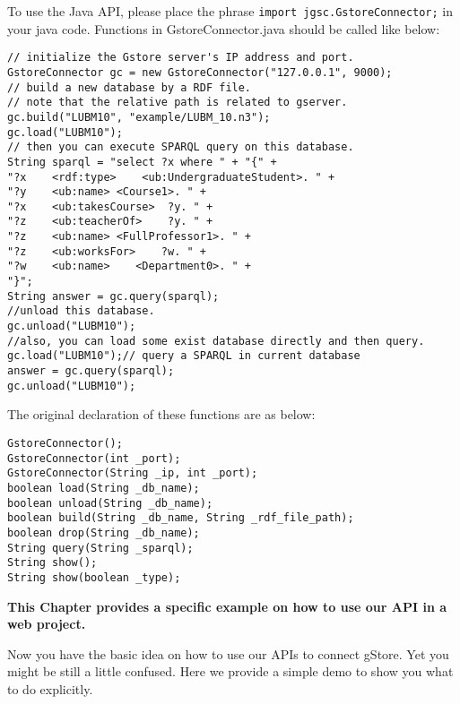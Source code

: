 \documentclass[titlepage, a4paper, 12pt]{article}
\begin{document}
To use the Java API, please place the phrase
\texttt{import\ jgsc.GstoreConnector;} in your java code. Functions in
GstoreConnector.java should be called like below:

\begin{verbatim}
// initialize the Gstore server's IP address and port.
GstoreConnector gc = new GstoreConnector("127.0.0.1", 9000);
// build a new database by a RDF file.
// note that the relative path is related to gserver.
gc.build("LUBM10", "example/LUBM_10.n3");
gc.load("LUBM10");
// then you can execute SPARQL query on this database.
String sparql = "select ?x where " + "{" +
"?x    <rdf:type>    <ub:UndergraduateStudent>. " +
"?y    <ub:name> <Course1>. " +
"?x    <ub:takesCourse>  ?y. " +
"?z    <ub:teacherOf>    ?y. " +
"?z    <ub:name> <FullProfessor1>. " +
"?z    <ub:worksFor>    ?w. " +
"?w    <ub:name>    <Department0>. " +
"}";
String answer = gc.query(sparql);
//unload this database.
gc.unload("LUBM10");
//also, you can load some exist database directly and then query.
gc.load("LUBM10");// query a SPARQL in current database
answer = gc.query(sparql);
gc.unload("LUBM10");
\end{verbatim}

The original declaration of these functions are as below:

\begin{verbatim}
GstoreConnector();
GstoreConnector(int _port);
GstoreConnector(String _ip, int _port);
boolean load(String _db_name);
boolean unload(String _db_name);
boolean build(String _db_name, String _rdf_file_path);
boolean drop(String _db_name);
String query(String _sparql);
String show();
String show(boolean _type);
\end{verbatim}

\clearpage


	
	\textbf{This Chapter provides a specific example on how to use our API in a web project.}
	
	
	Now you have the basic idea on how to use our APIs to connect gStore. Yet you might be still a little confused. Here we provide a simple demo to show you what to do explicitly.
\end{document}
